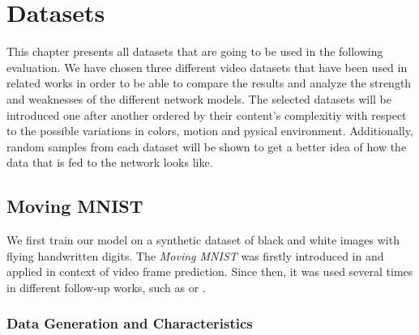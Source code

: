 




\chapter{Datasets} \label{chapter:datasets}

This chapter presents all datasets that are going to be used in the following evaluation. We have chosen three different video datasets that have been used in related works in order to be able to compare the results and analyze the strength and weaknesses of the different network models. The selected datasets will be introduced one after another ordered by their content's complexitiy with respect to the possible variations in colors, motion and pysical environment. Additionally, random samples from each dataset will be shown to get a better idea of how the data that is fed to the network looks like.


\section{Moving MNIST}


We first train our model on a synthetic dataset of black and white images with flying handwritten digits. The \textit{Moving MNIST} was firstly introduced in \parencite{unsup_learn_lstm} and applied in context of video frame prediction. Since then, it was used several times in different follow-up works, such as \parencite{spat_temp_video_autoenc} or \parencite{conv_lstm_nowcasting}. 

\subsection{Data Generation and Characteristics}

